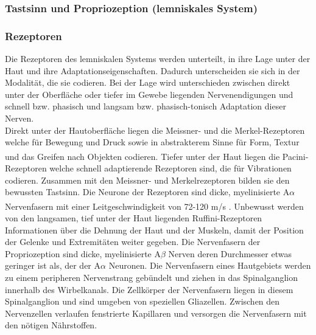\documentclass[12pt,a4paper,pdftex]{article}
\begin{document}
\subsubsection{Tastsinn und Propriozeption (lemniskales System)}

\subsubsection*{Rezeptoren}
Die Rezeptoren  des lemniskalen Systems werden unterteilt, in ihre Lage unter der Haut und ihre Adaptationseigenschaften. Dadurch unterscheiden sie sich in der Modalität, die sie codieren. Bei der Lage wird unterschieden zwischen direkt unter der Oberfläche oder tiefer im Gewebe liegenden Nervenendigungen und schnell bzw. phasisch und langsam bzw. phasisch-tonisch Adaptation dieser Nerven.\\
Direkt unter der Hautoberfläche liegen die Meissner- und die Merkel-Rezeptoren   welche für Bewegung und Druck sowie in abstrakterem Sinne für Form, Textur und das Greifen nach Objekten codieren. \textsuperscript{\cite[24]{paxinos2014rat}} Tiefer unter der Haut liegen die Pacini-Rezeptoren  welche schnell adaptierende Rezeptoren sind, die für Vibrationen codieren. Zusammen mit den Meissner- und Merkelrezeptoren bilden sie den bewussten Tastsinn. Die Neurone der Rezeptoren sind dicke, myelinisierte A$\alpha$ Nervenfasern mit einer Leitgeschwindigkeit von 72-120 m/s \textsuperscript{\cite[22]{kandel2013principles}}. Unbewusst werden von den langsamen, tief unter der Haut liegenden Ruffini-Rezeptoren  Informationen über die Dehnung der Haut und der Muskeln, damit der Position der Gelenke und Extremitäten weiter gegeben.
Die Nervenfasern der Propriozeption sind dicke, myelinisierte A$\beta$ Nerven deren Durchmesser etwas geringer ist als, der der A$\alpha$ Neuronen.
Die Nervenfasern eines Hautgebiets werden zu einem peripheren Nervenstrang gebündelt und ziehen in das Spinalganglion  innerhalb des Wirbelkanals. Die Zellkörper der Nervenfasern liegen in diesem Spinalganglion und sind umgeben von speziellen Gliazellen. Zwischen den Nervenzellen verlaufen fenstrierte Kapillaren und versorgen die Nervenfasern mit den nötigen Nährstoffen. 
\end{document}
